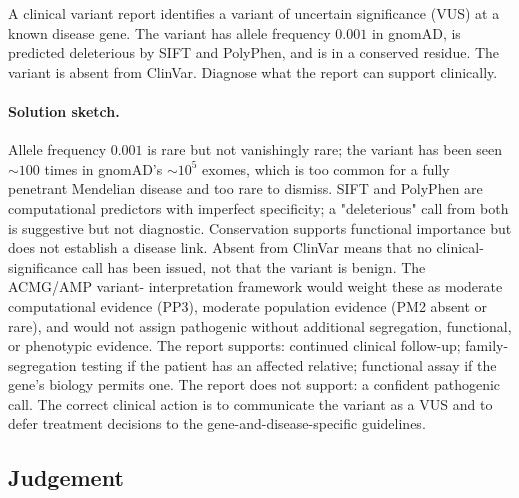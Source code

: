 \begin{exercise}
A clinical variant report identifies a variant of uncertain
significance (VUS) at a known disease gene. The variant has allele
frequency $0.001$ in gnomAD, is predicted deleterious by SIFT and
PolyPhen, and is in a conserved residue. The variant is absent from
ClinVar. Diagnose what the report can support clinically.

\paragraph{Solution sketch.}
Allele frequency $0.001$ is rare but not vanishingly rare; the
variant has been seen $\sim 100$ times in gnomAD's $\sim 10^{5}$
exomes, which is too common for a fully penetrant Mendelian
disease and too rare to dismiss. SIFT and PolyPhen are computational
predictors with imperfect specificity; a "deleterious" call from
both is suggestive but not diagnostic. Conservation supports
functional importance but does not establish a disease link. Absent
from ClinVar means that no clinical-significance call has been
issued, not that the variant is benign. The ACMG/AMP variant-
interpretation framework would weight these as moderate computational
evidence (PP3), moderate population evidence (PM2 absent or rare),
and would not assign pathogenic without additional segregation,
functional, or phenotypic evidence. The report supports: continued
clinical follow-up; family-segregation testing if the patient has an
affected relative; functional assay if the gene's biology permits
one. The report does not support: a confident pathogenic call. The
correct clinical action is to communicate the variant as a VUS and to
defer treatment decisions to the gene-and-disease-specific
guidelines.
\end{exercise}

\subsection*{Judgement}

